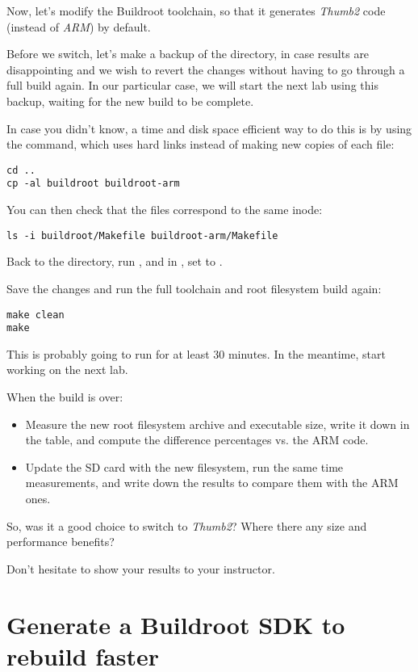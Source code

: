 Now, let's modify the Buildroot toolchain, so that it generates {\em
Thumb2} code (instead of {\em ARM}) by default.

Before we switch, let's make a backup of the  directory,
in case results are disappointing and we wish to revert the changes without
having to go through a full build again. In our particular case, we will
start the next lab using this backup, waiting for the new build to be
complete.

In case you didn't know, a time and disk space efficient way to do this is by using the
 command, which uses hard links instead of making new copies
of each file:

\begin{verbatim}
cd ..
cp -al buildroot buildroot-arm
\end{verbatim}

You can then check that the files correspond to the same inode:
\begin{verbatim}
ls -i buildroot/Makefile buildroot-arm/Makefile
\end{verbatim}

Back to the  directory, run , and
in , set  to
.

Save the changes and run the full toolchain and root filesystem build
again:

\begin{verbatim}
make clean
make
\end{verbatim}

This is probably going to run for at least 30 minutes. In the meantime,
start working on the next lab.

When the build is over:
\begin{itemize}
\item Measure the new root filesystem archive and 
executable size, write it down in the table, and compute the difference
percentages vs. the ARM code.
\item Update the SD card with the new filesystem, run the same time
measurements, and write down the results to compare them with the ARM
ones.
\end{itemize}

So, was it a good choice to switch to {\em Thumb2}? Where there any size
and performance benefits?

Don't hesitate to show your results to your instructor.

\section{Generate a Buildroot SDK to rebuild faster}

